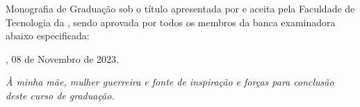 \documentclass[
	12pt,			%
	openright,		%
	oneside,	
	a4paper,		%
	english,		%
	brazil			%
]{abntex2/abntex2}  %
\begin{document}
\noindent


\frenchspacing

\imprimircapa

\imprimirfolhaderosto*

%
%
% 
%
\begin{folhadeaprovacao}
	\parindent=0pt
	\setlength{\ABNTEXsignskip}{1.5cm}

	Monografia de Graduação sob o título \textit{\imprimirtitulo} apresentada por {\imprimirautor} e aceita pela Faculdade de Tecnologia da {\imprimirinstituicao}, sendo aprovada por todos os membros da banca examinadora abaixo especificada:

	\vspace{1cm}
	\vspace{1cm}
	\vfill
      
	\begin{center}
		\fontsize{12}{15}\selectfont
		\vspace*{0.5cm}
		\imprimirlocal, 08 de Novembro de 2023.
		\vspace*{1cm}
	\end{center}
  
\end{folhadeaprovacao}

\begin{dedicatoria}
	
   \vspace*{\fill}
   \noindent
   \leftskip=7cm
   \textit{À minha mãe, mulher guerreira e fonte de inspiração e forças para conclusão deste curso de graduação.}
   \vspace{5cm}
   
\end{dedicatoria}
\end{document}
